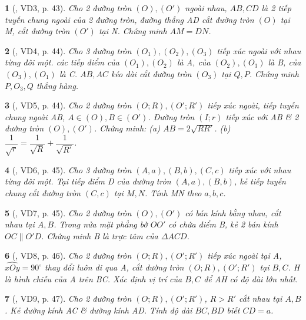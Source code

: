\documentclass{article}
\newtheorem{baitoan}{}
\begin{document}
\begin{baitoan}[\cite{TLCT_THCS_Toan_9_hinh_hoc}, VD3, p. 43]
	Cho 2 đường tròn $(O),(O')$ ngoài nhau, $AB,CD$ là 2 tiếp tuyến chung ngoài của 2 đường tròn, đường thẳng AD cắt đường tròn $(O)$ tại M, cắt đường tròn $(O')$ tại N. Chứng minh $AM = DN$.
\end{baitoan}

\begin{baitoan}[\cite{TLCT_THCS_Toan_9_hinh_hoc}, VD4, p. 44]
	Cho 3 đường tròn $(O_1),(O_2),(O_3)$ tiếp xúc ngoài với nhau từng đôi một. các tiếp điểm của $(O_1),(O_2)$ là A, của $(O_2),(O_3)$ là B, của $(O_3),(O_1)$ là C. $AB,AC$ kéo dài cắt đường tròn $(O_3)$ tại $Q,P$. Chứng minh $P,O_3,Q$ thẳng hàng.
\end{baitoan}

\begin{baitoan}[\cite{TLCT_THCS_Toan_9_hinh_hoc}, VD5, p. 44]
	Cho 2 đường tròn $(O;R),(O';R')$ tiếp xúc ngoài, tiếp tuyến chung ngoài AB, $A\in(O),B\in(O')$. Đường tròn $(I;r)$ tiếp xúc với AB \& 2 đường tròn $(O),(O')$. Chứng minh: (a) $AB = 2\sqrt{RR'}$. (b) $\dfrac{1}{\sqrt{r}} = \dfrac{1}{\sqrt{R}} + \dfrac{1}{\sqrt{R'}}$.
\end{baitoan}

\begin{baitoan}[\cite{TLCT_THCS_Toan_9_hinh_hoc}, VD6, p. 45]
	Cho 3 đường tròn $(A,a),(B,b),(C,c)$ tiếp xúc với nhau từng đôi một. Tại tiếp điểm D của đường tròn $(A,a),(B,b)$, kẻ tiếp tuyến chung cắt đường tròn $(C,c)$ tại $M,N$. Tính MN theo $a,b,c$.
\end{baitoan}

\begin{baitoan}[\cite{TLCT_THCS_Toan_9_hinh_hoc}, VD7, p. 45]
	Cho 2 đường tròn $(O),(O')$ có bán kính bằng nhau, cắt nhau tại $A,B$. Trong nửa mặt phẳng bờ $OO'$ có chứa điểm B, kẻ 2 bán kính $OC\parallel O'D$. Chứng minh B là trực tâm của $\Delta ACD$.
\end{baitoan}

\begin{baitoan}[\cite{TLCT_THCS_Toan_9_hinh_hoc}, VD8, p. 46]
	Cho 2 đường tròn $(O;R),(O';R')$ tiếp xúc ngoài tại A, $\widehat{xOy} = 90^\circ$  thay đổi luôn đi qua A, cắt đường tròn $(O;R),(O';R')$ tại $B,C$. H là hình chiếu của A trên BC. Xác định vị trí của $B,C$ để AH có độ dài lớn nhất.
\end{baitoan}

\begin{baitoan}[\cite{TLCT_THCS_Toan_9_hinh_hoc}, VD9, p. 47]
	Cho 2 đường tròn $(O;R),(O';R')$, $R > R'$ cắt nhau tại $A,B$. Kẻ đường kính AC \& đường kính AD. Tính độ dài $BC,BD$ biết $CD = a$.
\end{baitoan}
\end{document}
